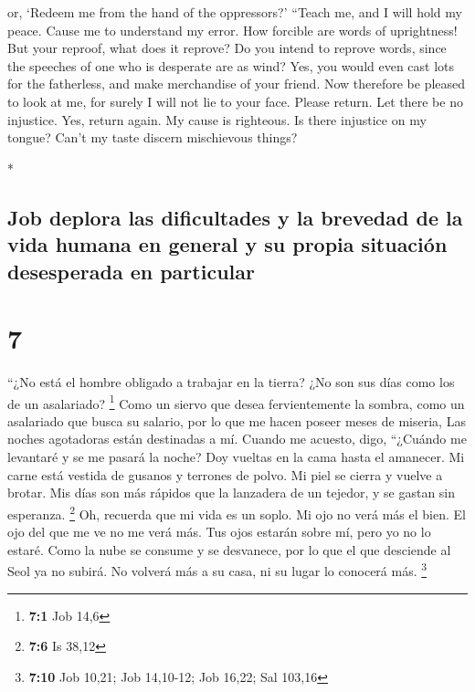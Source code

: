 \begin{paracol}{2}
\begin{otherlanguage}{english}
or, `Redeem me from the hand of the oppressors?'  ``Teach
me, and I will hold my peace. Cause me to understand my error.
 How forcible are words of uprightness! But your reproof,
what does it reprove?  Do you intend to reprove words,
since the speeches of one who is desperate are as wind? 
Yes, you would even cast lots for the fatherless, and make merchandise
of your friend.  Now therefore be pleased to look at me,
for surely I will not lie to your face.  Please return.
Let there be no injustice. Yes, return again. My cause is righteous.
 Is there injustice on my tongue? Can't my taste discern
mischievous things?

\end{otherlanguage}

\switchcolumn[0]*

\hypertarget{job-deplora-las-dificultades-y-la-brevedad-de-la-vida-humana-en-general-y-su-propia-situaciuxf3n-desesperada-en-particular}{%
\subsection{Job deplora las dificultades y la brevedad de la vida humana
en general y su propia situación desesperada en
particular}\label{job-deplora-las-dificultades-y-la-brevedad-de-la-vida-humana-en-general-y-su-propia-situaciuxf3n-desesperada-en-particular}}

\hypertarget{section-12}{%
\section{7}\label{section-12}}

 ``¿No está el hombre obligado a trabajar en la tierra?
¿No son sus días como los de un asalariado? \footnote{\textbf{7:1} Job
  14,6}  Como un siervo que desea fervientemente la
sombra, como un asalariado que busca su salario,  por lo
que me hacen poseer meses de miseria, Las noches agotadoras están
destinadas a mí.  Cuando me acuesto, digo, ``¿Cuándo me
levantaré y se me pasará la noche? Doy vueltas en la cama hasta el
amanecer.  Mi carne está vestida de gusanos y terrones de
polvo. Mi piel se cierra y vuelve a brotar.  Mis días son
más rápidos que la lanzadera de un tejedor, y se gastan sin esperanza.
\footnote{\textbf{7:6} Is 38,12}  Oh, recuerda que mi vida
es un soplo. Mi ojo no verá más el bien.  El ojo del que
me ve no me verá más. Tus ojos estarán sobre mí, pero yo no lo estaré.
 Como la nube se consume y se desvanece, por lo que el que
desciende al Seol ya no subirá.  No volverá más a su
casa, ni su lugar lo conocerá más. \footnote{\textbf{7:10} Job 10,21;
  Job 14,10-12; Job 16,22; Sal 103,16}


\end{paracol}
